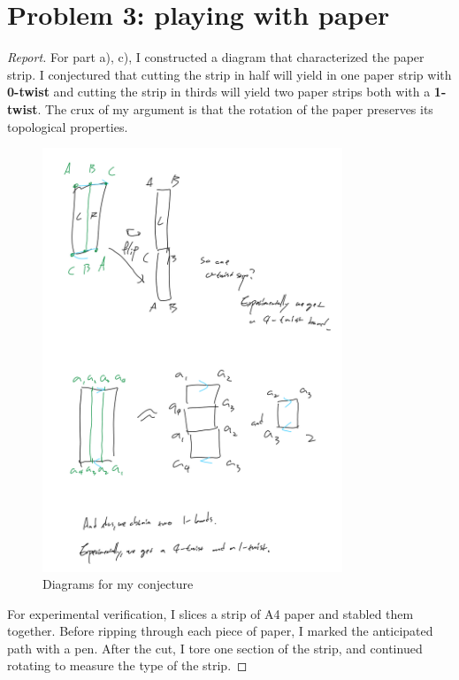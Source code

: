 \documentclass{article}
\begin{document}
\section{Problem 3: playing with paper}
\begin{proof}[Report]
    For part a), c), I constructed a diagram that characterized 
    the paper strip. I conjectured that cutting the strip in half 
    will yield in one paper strip with \textbf{0-twist} and 
    cutting the strip in thirds will yield two paper strips both with 
    a \textbf{1-twist}. The crux of my argument is that the rotation of 
    the paper preserves its topological properties. 
    \begin{figure}[h]
        \centering
        \includegraphics[width=0.8\textwidth]{conjectures.png} %
        \caption{Diagrams for my conjecture}
        \label{fig:conjectures}
    \end{figure}
    For experimental verification, I slices a strip of A4 paper 
    and stabled them together. Before ripping through each 
    piece of paper, I marked the anticipated path with a pen. 
    After the cut, I tore one section of the strip, and continued rotating to 
    measure the type of the strip. 


\end{proof}
\end{document}
